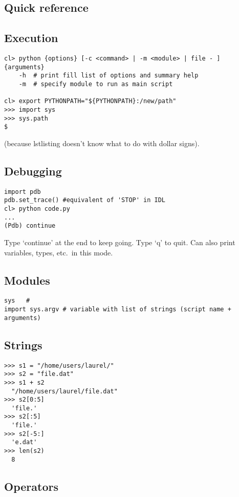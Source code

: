 \documentclass{article}
\begin{document}
\begin{multicols}{2}
\raggedcolumns
\section{Quick reference}
\setcounter{secnumdepth}{0}

\subsection{Execution}
\begin{lstlisting}
cl> python {options} [-c <command> | -m <module> | file - ] {arguments}
    -h  # print fill list of options and summary help
    -m  # specify module to run as main script

cl> export PYTHONPATH="${PYTHONPATH}:/new/path"
>>> import sys
>>> sys.path
$
\end{lstlisting}
(because lstlisting doesn't know what to do with dollar signs).

\subsection{Debugging}
\begin{lstlisting}
import pdb
pdb.set_trace() #equivalent of 'STOP' in IDL
cl> python code.py
...
(Pdb) continue
\end{lstlisting}
Type `continue' at the end to keep going. Type `q' to quit.
Can also print variables, types, etc.\ in this mode.

\subsection{Modules}
\begin{lstlisting}
sys   #
import sys.argv # variable with list of strings (script name + arguments)
\end{lstlisting}

\subsection{Strings}
\begin{lstlisting}
>>> s1 = "/home/users/laurel/"
>>> s2 = "file.dat"
>>> s1 + s2
  "/home/users/laurel/file.dat"
>>> s2[0:5]
  'file.'
>>> s2[:5]
  'file.'
>>> s2[-5:]
  'e.dat'
>>> len(s2)
  8
\end{lstlisting}

\subsection{Operators}

\end{multicols}
\end{document}
